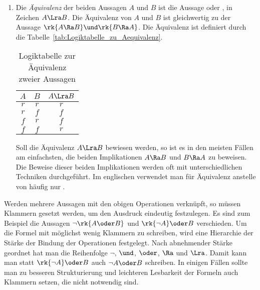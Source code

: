 \begin{enumerate}
\item Die \emph{Äquivalenz} der beiden Aussagen $A$ und $B$ ist die Aussage  oder , in Zeichen $A \Lra B$. Die Äquivalenz von $A$ und $B$ ist gleichwertig zu der Aussage $\rk{A \Ra B} \und \rk{B \Ra A}$. Die Äquivalenz ist definiert durch die Tabelle~\vref{tab:Logiktabelle_zu_Aequivalenz}.
	\begin{table}[htb]
	\centering
	\begin{tabular}{c|c|c}
	$A$ & $B$ & $A \Lra B$\\
	\hline
	$r$ & $r$ & $r$\\
	$r$ & $f$ & $f$\\
	$f$ & $r$ & $f$\\
	$f$ & $f$ & $r$\\
	\end{tabular}
	\label{tab:Logiktabelle_zu_Aequivalenz}
	\caption{Logiktabelle zur Äquivalenz zweier Aussagen}
	\end{table}

	Soll die Äquivalenz $A \Lra B$ bewiesen werden, so ist es in den meisten Fällen am einfachsten, die beiden Implikationen $A \Ra B$ und $B \Ra A$ zu beweisen. Die Beweise dieser beiden Implikationen werden oft mit unterschiedlichen Techniken durchgeführt. Im englischen verwendet man für Äquivalenz anstelle von  häufig nur .
\end{enumerate}

Werden mehrere Aussagen mit den obigen Operationen verknüpft, so müssen Klammern gesetzt werden, um den Ausdruck eindeutig festzulegen. Es sind zum Beispiel die Aussagen $\neg \rk{A \oder B}$ und $\rk{\neg A} \oder B$ verschieden. Um die Formel mit möglichst wenig Klammern zu schreiben, wird eine Hierarchie der Stärke der Bindung der Operationen festgelegt. Nach abnehmender Stärke geordnet hat man die Reihenfolge $\neg$, $\und$, $\oder$, $\Ra$ und $\Lra$. Damit kann man statt $\rk{\neg A} \oder B$ auch $\neg A \oder B$ schreiben. In einigen Fällen sollte man zu besseren Strukturierung und leichteren Lesbarkeit der Formeln auch Klammern setzen, die nicht notwendig sind.

